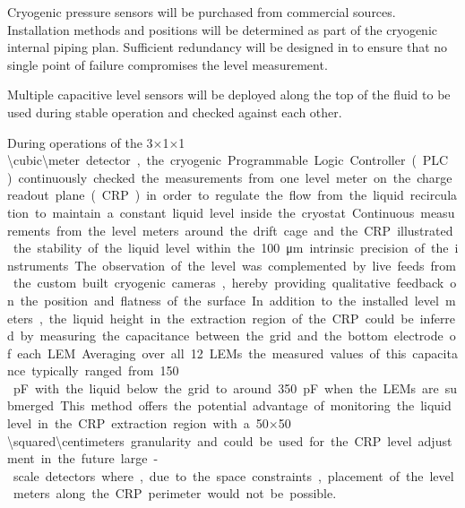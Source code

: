 Cryogenic pressure sensors will be purchased from commercial sources.
Installation methods and positions will be determined as part of the
cryogenic internal piping plan.  Sufficient redundancy will be designed in
to ensure that no single point of failure compromises the level measurement.

Multiple capacitive level sensors will be deployed along the top of
the fluid to be used during stable operation and checked against each
other.

During operations of the 3$\times$1$\times$1\,\SI{\cubic\meter} detector, the cryogenic Programmable Logic Controller (PLC) continuously checked the measurements from one level meter on the charge readout plane (CRP) in order to regulate the flow from the liquid recirculation to maintain a constant liquid level inside the cryostat. Continuous measurements from the level meters around the drift cage and the CRP illustrated the stability of the liquid level within the \SI{100}{\micro\meter} intrinsic precision of the instruments. The observation of the level was complemented by live feeds from the custom built cryogenic cameras, hereby providing qualitative feedback on the position and flatness of the surface.

In addition to the installed level meters, the liquid height in the extraction region of the CRP could be inferred by measuring the capacitance between the grid and the bottom electrode of each LEM. Averaging over all 12 LEMs the measured values of this capacitance typically ranged from 150\,pF with the liquid below the grid to around 350 pF when the LEMs are submerged.This method offers the potential advantage of monitoring the liquid level in the CRP extraction region with a 50$\times$50\,\SI{\squared\centimeters} granularity and could be used for the CRP level adjustment in the future large-scale detectors where, due to the space constraints, placement of the level meters along the CRP perimeter would not be possible.

